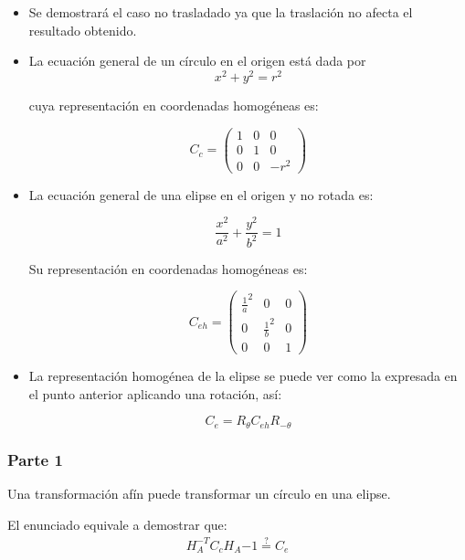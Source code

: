 \begin{itemize}
\item Se demostrará el caso no trasladado ya que la traslación no afecta el resultado obtenido.

\item La ecuación general de un círculo en el origen está dada por
\begin{equation*}
x^2+y^2=r^2
\end{equation*}

cuya representación en coordenadas homogéneas es:

\begin{equation*}
C_c=
\begin{pmatrix}
1 & 0 & 0 \\ 
0 & 1 & 0 \\
0 & 0 & -r^2
\end{pmatrix} 
\end{equation*} 

\item La ecuación general de una elipse en el origen y no rotada es:

\begin{equation*}
\frac{x^2}{a^2} + \frac{y^2}{b^2} = 1
\end{equation*} 

Su representación en coordenadas
homogéneas es:

\begin{equation*}
C_{eh}=
\begin{pmatrix}
\frac{1}{a}^2 & 0 & 0 \\ 
0 & \frac{1}{b}^2 & 0 \\
0 & 0 & 1
\end{pmatrix} 
\end{equation*} 

\item La representación homogénea de la elipse se puede ver como la expresada en el punto anterior
aplicando una rotación, así:

\begin{equation}
C_e = R_\theta C_{eh} R_{-\theta}
\label{eq:p83}
\end{equation} 

\end{itemize} 

\subsubsection*{Parte 1}Una transformación afín puede transformar un círculo en una elipse.

El enunciado equivale a demostrar que:
\begin{equation*}
\begin{aligned}
H_A^{-T} C_c H_A{-1} \stackrel{?}{=} C_e
\end{aligned}
\end{equation*} 

